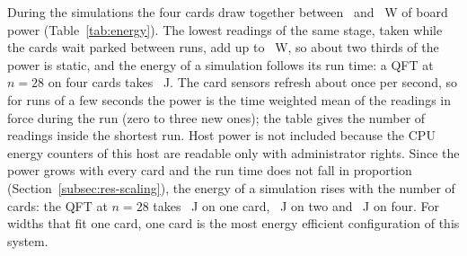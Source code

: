 During the simulations the four cards draw together between \NumEnergyPowerMinFour~and \NumEnergyPowerMaxFour~W of
board power (Table~\ref{tab:energy}). The lowest readings of the same stage, taken while the cards wait parked
between runs, add up to \NumEnergyIdleFour~W, so about two thirds of the power is static, and the energy of a
simulation follows its run time: a QFT at $n=28$ on four cards takes \NumEnergyQftTwentyEightFour~J. The card sensors
refresh about once per second, so for runs of a few seconds the power is the time weighted mean of the readings in force during the run (zero to three new ones);
the table gives the number of readings inside the shortest run. Host power is not included because the CPU energy
counters of this host are readable only with administrator rights. Since the power grows with every card and the run time does not fall in proportion
(Section~\ref{subsec:res-scaling}), the energy of a simulation rises with the number of cards: the QFT at $n=28$
takes \NumEnergyQftTwentyEightOne~J on one card, \NumEnergyQftTwentyEightTwo~J on two and
\NumEnergyQftTwentyEightFour~J on four. For widths that fit one card, one card is the most energy efficient
configuration of this system.
